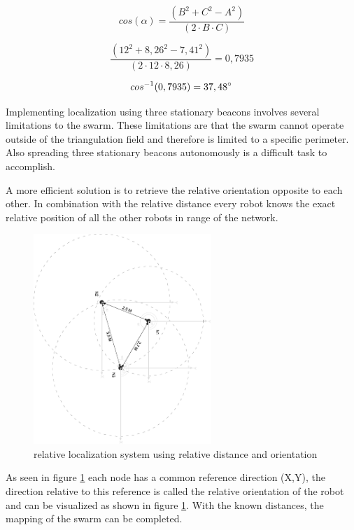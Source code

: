\documentclass[10pt,a4paper]{article}
\begin{document}
\begin{equation}
\label{eq:hoek}
cos(\alpha) = \frac{(B^2 + C^2 - A^2)}{(2\cdot B\cdot C)}
\end{equation}

\begin{equation}
\label{eq:hoek}
\frac{(12^2 + 8,26^2 - 7,41^2)}{(2\cdot12\cdot8,26)} = 0,7935
\end{equation}

\begin{equation}
cos^{-1}(0,7935) = 37,48\degree
\end{equation}

Implementing localization using three stationary beacons involves several limitations to the swarm. These limitations are that the swarm cannot operate outside of the triangulation field and therefore is limited to a specific perimeter. Also spreading three stationary beacons autonomously is a difficult task to accomplish.  

A more efficient solution is to retrieve the relative orientation opposite to each other. In combination with the relative distance every robot knows the exact relative position of all the other robots in range of the network.

\begin{figure}[H]
\centering
\includegraphics[angle=90, width=0.6\textwidth]{orientation.pdf}
\caption{relative localization system using relative distance and orientation}
\label{orientation}
\end{figure}

As seen in figure \ref{orientation} each node has a common reference direction (X,Y), the direction relative to this reference is called the relative orientation of the robot and can be visualized as shown in figure \ref{orientation}. With the known distances, the mapping of the swarm can be completed.
\newpage
\end{document}
